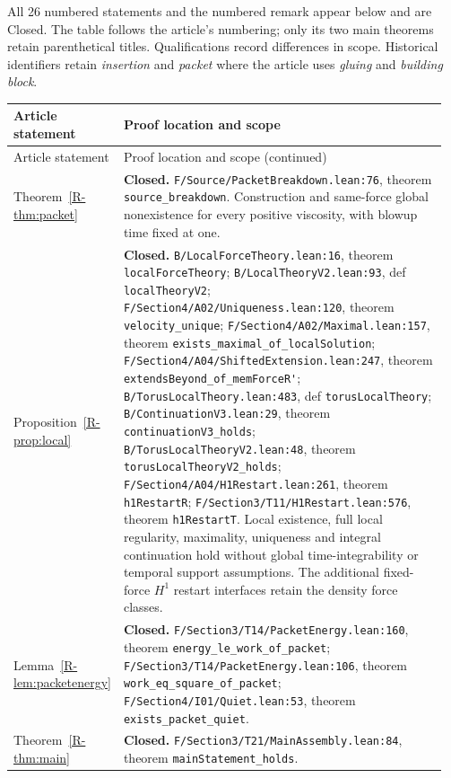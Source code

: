 \documentclass[11pt,a4paper]{article}
\newcommand{\code}[1]{\nolinkurl{#1}}
\newcommand{\paperref}[1]{\ref{R-#1}}
\newcommand{\source}[4]{\code{#1.lean:#2}, #4 \code{#3}}
\newcommand{\mapped}[2]{#1~\paperref{#2}}
\newcommand{\coverage}[1]{\textbf{#1.} }
\begin{document}
All 26 numbered statements and the numbered remark appear below and are Closed.
The table follows the article's numbering; only its two main theorems retain
parenthetical titles. Qualifications
record differences in scope. Historical identifiers retain \emph{insertion}
and \emph{packet} where the article uses \emph{gluing} and \emph{building block}.

\begingroup\small
\setlength{\tabcolsep}{3pt}
\setlength{\LTpre}{6pt}
\renewcommand{\arraystretch}{1.15}
\begin{longtable}{@{}>{\raggedright\arraybackslash}p{0.20\linewidth}>{\raggedright\arraybackslash}p{0.76\linewidth}@{}}
\toprule Article statement & Proof location and scope \\\midrule
\endfirsthead
\toprule Article statement & Proof location and scope (continued) \\\midrule
\endhead
\bottomrule\endfoot
\mapped{Theorem}{thm:packet} &
\coverage{Closed}\source{F/Source/PacketBreakdown}{76}{source_breakdown}{theorem}.
Construction and same-force global nonexistence for every positive viscosity,
with blowup time fixed at one. \\
\mapped{Proposition}{prop:local} &
\coverage{Closed}\source{B/LocalForceTheory}{16}{localForceTheory}{theorem};
\source{B/LocalTheoryV2}{93}{localTheoryV2}{def};
\source{F/Section4/A02/Uniqueness}{120}{velocity_unique}{theorem};
\source{F/Section4/A02/Maximal}{157}{exists_maximal_of_localSolution}{theorem};
\source{F/Section4/A04/ShiftedExtension}{247}{extendsBeyond_of_memForceR'}{theorem};
\source{B/TorusLocalTheory}{483}{torusLocalTheory}{def};
\source{B/ContinuationV3}{29}{continuationV3_holds}{theorem};
\source{B/TorusLocalTheoryV2}{48}{torusLocalTheoryV2_holds}{theorem};
\source{F/Section4/A04/H1Restart}{261}{h1RestartR}{theorem};
\source{F/Section3/T11/H1Restart}{576}{h1RestartT}{theorem}.
Local existence, full local regularity, maximality, uniqueness and integral
continuation hold without global time-integrability or temporal support
assumptions. The additional fixed-force $H^1$ restart interfaces retain
the density force classes. \\
\mapped{Lemma}{lem:packetenergy} & \coverage{Closed}\source{F/Section3/T14/PacketEnergy}{160}{energy_le_work_of_packet}{theorem}; \source{F/Section3/T14/PacketEnergy}{106}{work_eq_square_of_packet}{theorem}; \source{F/Section4/I01/Quiet}{53}{exists_packet_quiet}{theorem}. \\
\mapped{Theorem}{thm:main} & \coverage{Closed}\source{F/Section3/T21/MainAssembly}{84}{mainStatement_holds}{theorem}. \\

\end{longtable}
\end{document}
